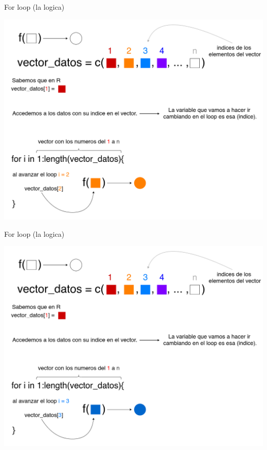 \documentclass[
  10pt,
  ignorenonframetext,
]{beamer}
\begin{document}
\begin{frame}{For loop (la logica)}
\protect\hypertarget{for-loop-la-logica-5}{}
\begin{center}\includegraphics[width=0.9\linewidth]{images/explicando_forloops_en_r_2} \end{center}
\end{frame}

\begin{frame}{For loop (la logica)}
\protect\hypertarget{for-loop-la-logica-6}{}
\begin{center}\includegraphics[width=0.9\linewidth]{images/explicando_forloops_en_r_3} \end{center}
\end{frame}
\end{document}
